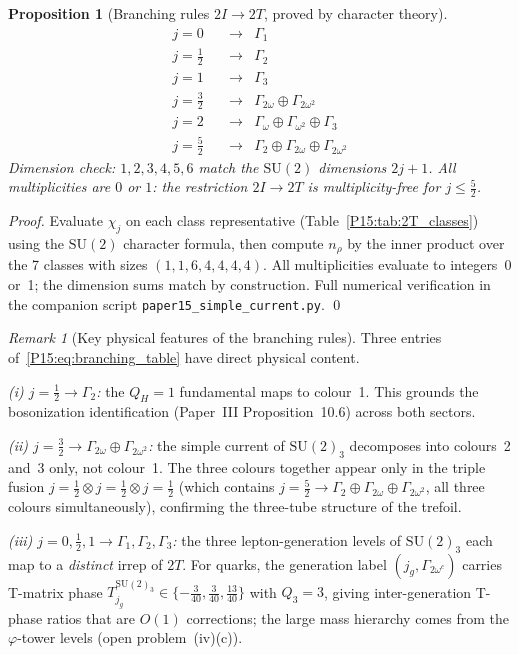 \documentclass[11pt,a4paper]{article}
\newtheorem{proposition}[theorem]{Proposition}
\theoremstyle{definition}\newtheorem{definition}[theorem]{Definition}
\theoremstyle{remark}
\newtheorem{remark}[theorem]{Remark}
\newcommand{\vp}{\varphi}
\newcommand{\twoT}{2T}
\newcommand{\QH}{Q_H}
\begin{document}
\begin{proposition}[Branching rules $2I\to 2T$, proved by character theory]
\label{P15:prop:branching}
\begin{equation}
\renewcommand{\arraystretch}{1.3}
\begin{array}{rll}
  j=0\phantom{/2}& \to & \Gamma_1 \\[2pt]
  j=\tfrac12 & \to & \Gamma_2 \\[2pt]
  j=1\phantom{/2} & \to & \Gamma_3 \\[2pt]
  j=\tfrac32 & \to & \Gamma_{2\omega}\oplus\Gamma_{2\omega^2} \\[2pt]
  j=2\phantom{/2} & \to & \Gamma_\omega\oplus\Gamma_{\omega^2}\oplus\Gamma_3 \\[2pt]
  j=\tfrac52 & \to & \Gamma_2\oplus\Gamma_{2\omega}\oplus\Gamma_{2\omega^2}
\end{array}
\label{P15:eq:branching_table}
\end{equation}
Dimension check: $1,2,3,4,5,6$ match the $\mathrm{SU}(2)$ dimensions $2j+1$.
All multiplicities are $0$ or $1$: the restriction $2I\to 2T$ is
multiplicity-free for $j\le\tfrac52$.
\end{proposition}

\begin{proof}
Evaluate $\chi_j$ on each class representative (Table~\ref{P15:tab:2T_classes})
using the $\mathrm{SU}(2)$ character formula, then compute $n_\rho$ by the inner
product over the 7 classes with sizes $(1,1,6,4,4,4,4)$.
All multiplicities evaluate to integers~0 or~1; the dimension sums
match by construction. Full numerical verification in the companion
script \texttt{paper15\_simple\_current.py}.
\qed
\end{proof}

\begin{remark}[Key physical features of the branching rules]
\label{P15:rem:branching_key_features}
Three entries of~\eqref{P15:eq:branching_table} have direct physical content.

\emph{(i) $j=\tfrac12\to\Gamma_2$:} the $\QH=1$ fundamental maps to
colour~1. This grounds the bosonization identification (Paper~III
Proposition~10.6) across both sectors.

\emph{(ii) $j=\tfrac32\to\Gamma_{2\omega}\oplus\Gamma_{2\omega^2}$:}
the simple current of $\mathrm{SU}(2)_3$ decomposes into
colours~2 and~3 only, not colour~1.
The three colours together appear only in the triple fusion
$j=\tfrac12\otimes j=\tfrac12\otimes j=\tfrac12$
(which contains $j=\tfrac52\to\Gamma_2\oplus\Gamma_{2\omega}\oplus\Gamma_{2\omega^2}$,
all three colours simultaneously), confirming the three-tube structure of the trefoil.

\emph{(iii) $j=0,\tfrac12,1\to\Gamma_1,\Gamma_2,\Gamma_3$:}
the three lepton-generation levels of $\mathrm{SU}(2)_3$
each map to a \emph{distinct} irrep of $\twoT$.
For quarks, the generation label $(j_g,\Gamma_{2\omega^c})$ carries
T-matrix phase $T_{j_g}^{\mathrm{SU}(2)_3}\in\{-\tfrac{3}{40},\tfrac{3}{40},\tfrac{13}{40}\}$
with $Q_3=3$, giving inter-generation T-phase ratios that are $O(1)$ corrections;
the large mass hierarchy comes from the $\vp$-tower levels (open problem~(iv)(c)).
\end{remark}
\end{document}

